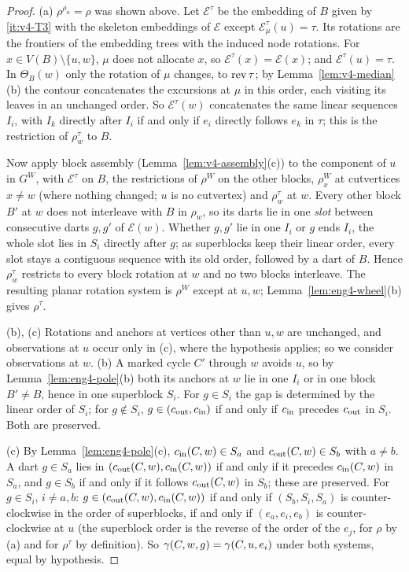 \begin{proof}
(a) $\rho^{\rho_u}=\rho$ was shown above. Let $\mathcal E^\tau$ be the
embedding of $B$ given by \ref{it:v4-T3} with the skeleton embeddings of $\mathcal
E$ except $\mathcal E^\tau_\mu(u)=\tau$. Its rotations are the frontiers of
the embedding trees with the induced node rotations. For $x\in
V(B)\setminus\{u,w\}$, $\mu$ does not allocate $x$, so $\mathcal
E^\tau(x)=\mathcal E(x)$; and $\mathcal E^\tau(u)=\tau$. In $\Theta_B(w)$
only the rotation of $\mu$ changes, to $\operatorname{rev}\tau$; by
Lemma~\ref{lem:v4-median}(b) the contour concatenates the excursions at
$\mu$ in this order, each visiting its leaves in an unchanged order. So
$\mathcal E^\tau(w)$ concatenates the same linear sequences $I_i$, with $I_k$
directly after $I_i$ if and only if $e_i$ directly follows $e_k$ in $\tau$;
this is the restriction of $\rho^\tau_w$ to $B$.

Now apply block assembly (Lemma~\ref{lem:v4-assembly}(c)) to the component
of $u$ in $G^W$, with $\mathcal E^\tau$ on $B$, the restrictions of $\rho^W$
on the other blocks, $\rho^W_x$ at cutvertices $x\ne w$ (where nothing
changed; $u$ is no cutvertex) and $\rho^\tau_w$ at $w$. Every other block
$B'$ at $w$ does not interleave with $B$ in $\rho_w$, so its darts lie in
one \emph{slot} between consecutive darts $g,g'$ of $\mathcal E(w)$. Whether
$g,g'$ lie in one $I_i$ or $g$ ends $I_i$, the whole slot lies in $S_i$
directly after $g$; as superblocks keep their linear order, every slot stays
a contiguous sequence with its old order, followed by a dart of $B$. Hence
$\rho^\tau_w$ restricts to every block rotation at $w$ and no two blocks
interleave. The resulting planar rotation system is $\rho^W$ except at $u,w$;
Lemma~\ref{lem:eng4-wheel}(b) gives $\rho^\tau$.

(b), (c) Rotations and anchors at vertices other than $u,w$ are unchanged,
and observations at $u$ occur only in (c), where the hypothesis applies; so
we consider observations at $w$. (b) A marked cycle $C'$ through $w$ avoids
$u$, so by
Lemma~\ref{lem:eng4-pole}(b) both its anchors at $w$ lie in one $I_i$ or in
one block $B'\ne B$, hence in one superblock $S_i$. For $g\in S_i$ the gap is
determined by the linear order of $S_i$; for $g\notin S_i$,
$g\in(c_{\mathrm{out}},c_{\mathrm{in}})$ if and only if $c_{\mathrm{in}}$ precedes $c_{\mathrm{out}}$ in $S_i$. Both
are preserved.

(c) By Lemma~\ref{lem:eng4-pole}(c), $c_{\mathrm{in}}(C,w)\in S_a$ and $c_{\mathrm{out}}(C,w)\in
S_b$ with $a\ne b$. A dart $g\in S_a$ lies in $(c_{\mathrm{out}}(C,w),c_{\mathrm{in}}(C,w))$ if
and only if it precedes $c_{\mathrm{in}}(C,w)$ in $S_a$, and $g\in S_b$ if and only if
it follows $c_{\mathrm{out}}(C,w)$ in $S_b$; these are preserved. For $g\in S_i$, $i\ne
a,b$: $g\in(c_{\mathrm{out}}(C,w),c_{\mathrm{in}}(C,w))$ if and only if $(S_b,S_i,S_a)$ is
counter-clockwise in the order of superblocks, if and only if $(e_a,e_i,e_b)$
is counter-clockwise at $u$ (the superblock order is the reverse of the
order of the $e_j$, for $\rho$ by (a) and for $\rho^\tau$ by definition). So
$\gamma(C,w,g)=\gamma(C,u,e_i)$ under both systems, equal by hypothesis.
\end{proof}

